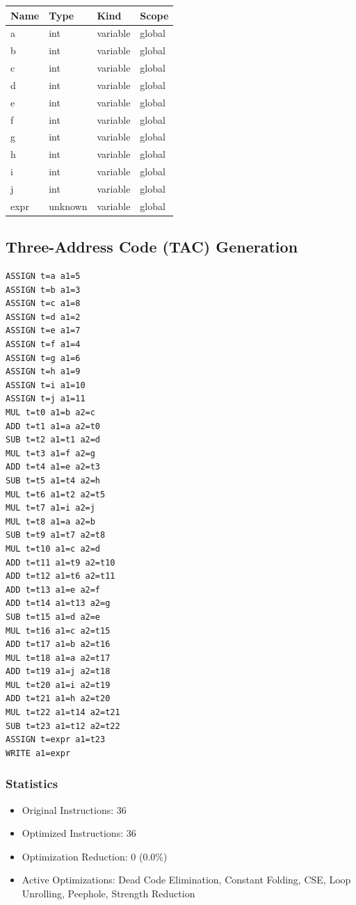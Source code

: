 \documentclass[12pt,a4paper]{report}
\begin{document}
\begin{center}
\begin{tabular}{|l|l|l|l|}
\hline
\textbf{Name} & \textbf{Type} & \textbf{Kind} & \textbf{Scope} \\
\hline
a & int & variable & global \\
b & int & variable & global \\
c & int & variable & global \\
d & int & variable & global \\
e & int & variable & global \\
f & int & variable & global \\
g & int & variable & global \\
h & int & variable & global \\
i & int & variable & global \\
j & int & variable & global \\
expr & unknown & variable & global \\
\hline
\end{tabular}
\end{center}

\subsection{Three-Address Code (TAC) Generation}

\begin{lstlisting}[caption={TAC for Program 1}]
ASSIGN t=a a1=5
ASSIGN t=b a1=3
ASSIGN t=c a1=8
ASSIGN t=d a1=2
ASSIGN t=e a1=7
ASSIGN t=f a1=4
ASSIGN t=g a1=6
ASSIGN t=h a1=9
ASSIGN t=i a1=10
ASSIGN t=j a1=11
MUL t=t0 a1=b a2=c
ADD t=t1 a1=a a2=t0
SUB t=t2 a1=t1 a2=d
MUL t=t3 a1=f a2=g
ADD t=t4 a1=e a2=t3
SUB t=t5 a1=t4 a2=h
MUL t=t6 a1=t2 a2=t5
MUL t=t7 a1=i a2=j
MUL t=t8 a1=a a2=b
SUB t=t9 a1=t7 a2=t8
MUL t=t10 a1=c a2=d
ADD t=t11 a1=t9 a2=t10
ADD t=t12 a1=t6 a2=t11
ADD t=t13 a1=e a2=f
ADD t=t14 a1=t13 a2=g
SUB t=t15 a1=d a2=e
MUL t=t16 a1=c a2=t15
ADD t=t17 a1=b a2=t16
MUL t=t18 a1=a a2=t17
ADD t=t19 a1=j a2=t18
MUL t=t20 a1=i a2=t19
ADD t=t21 a1=h a2=t20
MUL t=t22 a1=t14 a2=t21
SUB t=t23 a1=t12 a2=t22
ASSIGN t=expr a1=t23
WRITE a1=expr
\end{lstlisting}

\subsubsection{Statistics}
\begin{itemize}
    \item Original Instructions: 36
    \item Optimized Instructions: 36
    \item Optimization Reduction: 0 (0.0\%)
    \item Active Optimizations: Dead Code Elimination, Constant Folding, CSE, Loop Unrolling, Peephole, Strength Reduction
\end{itemize}
\end{document}
